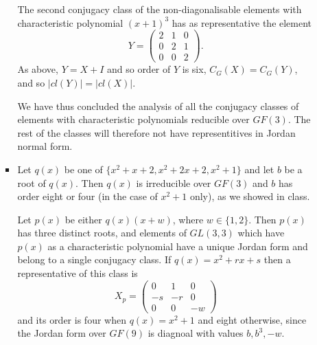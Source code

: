\documentclass[11pt]{article} \usepackage{amssymb}
\begin{document}
\begin{enumerate}
\begin{enumerate}
\begin{itemize}
        The second conjugacy class of the non-diagonalisable elements with 
        characteristic polynomial
        $(x+1)^3$ has as representative the element
        \begin{equation*}
          Y=
          \begin{pmatrix}
            2&1  &0 \\ 
            0&2  &1 \\ 
            0&0  &2 
          \end{pmatrix}.
        \end{equation*}
        As above, $Y=X+I$ and so order of $Y$ is six,
        $C_G(X)=C_G(Y)$, and so $|cl(Y)|=|cl(X)|$.
        

        We have thus concluded the analysis of all the
        conjugacy classes of elements with characteristic polynomials 
        reducible over $GF(3)$. The rest of the classes will therefore not have
        representitives in Jordan normal form.

      \item
        Let $q(x)$ be one of $\{x^2+x+2,x^2+2x+2,x^2+1\}$ and let $b$ be a 
        root of
        $q(x)$. Then $q(x)$ is irreducible over $GF(3)$ and $b$ has order
        eight or four (in the case of $x^2+1$ only), as we showed in class. 

        Let $p(x)$ be either $q(x)(x+w)$, where $w\in\{1,2\}$. 
        Then $p(x)$ has three distinct roots, and elements of
        $GL(3,3)$ which have $p(x)$ as a characteristic polynomial have a
        unique Jordan form and belong to a single conjugacy class. 
        If $q(x)=x^2+rx+s$ then a
        representative of this class is
        \begin{equation*}
          X_p=\begin{pmatrix}
            0 & 1 & 0\\
            -s & -r & 0\\
            0 & 0 & -w
            \end{pmatrix}
        \end{equation*}
        and its order is four when $q(x)=x^2+1$ and eight otherwise, since
        the Jordan form over $GF(9)$ is diagnoal with values $b,b^3,-w$.
        

\end{itemize}
\end{enumerate}
\end{enumerate}
\end{document}
